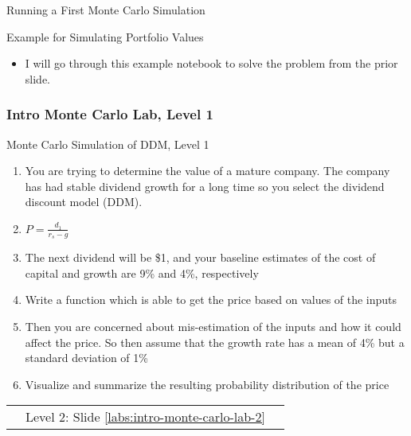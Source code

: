 \documentclass[handout, 11pt]{beamer}
\begin{document}
\begin{section}[Run MC]{Running a First Monte Carlo Simulation}
\begin{frame}
{\begin{block}{Example for Simulating Portfolio Values}
\begin{itemize}
\item I will go through this example notebook to solve the problem from the prior slide.
\end{itemize}
\end{block}
}
\end{frame}
\footnotesize
\begin{frame}
\frametitle{Intro Monte Carlo Lab, Level 1}
{
\begin{block}{Monte Carlo Simulation of DDM, Level 1}
\begin{enumerate}
\item You are trying to determine the value of a mature company. The company has had stable dividend growth for a long time so you select the dividend discount model (DDM).
\item $P = \frac{d_1}{r_s - g}$
\item The next dividend will be \$1, and your baseline estimates of the cost of capital and growth are 9\% and 4\%, respectively
\item Write a function which is able to get the price based on values of the inputs
\item Then you are concerned about mis-estimation of the inputs and how it could affect the price. So then assume that the growth rate has a mean of 4\% but a standard deviation of 1\%
\item Visualize and summarize the resulting probability distribution of the price
\end{enumerate}
\vfill
\begin{tabular*}{\textwidth}{@{\extracolsep{\fill}}ccc}
\toprule
\hfill & Level 2: Slide \textcolor{blue}{\underline{\ref{labs:intro-monte-carlo-lab-2}}} & \hfill\\

\end{tabular*}
\end{block}
}
\label{labs:intro-monte-carlo-lab-1}
\end{frame}
\normalsize
\end{section}
\end{document}
